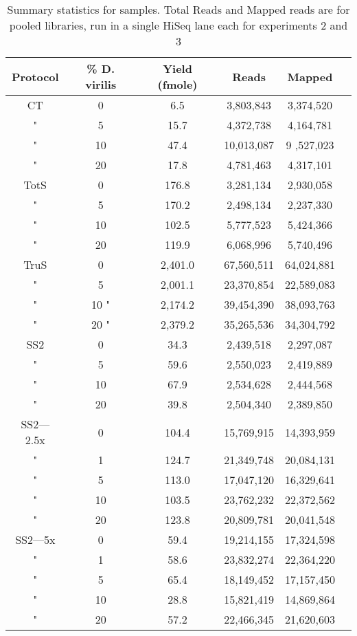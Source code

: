 \begin{table}[htdp]
\begin{center}
\begin{tabular}{|c|c|c|c|c|c|} \hline
Protocol & \%  D. virilis  &  Yield (fmole) & Reads & Mapped \\\hline 
CT & 0  & 6.5  & 3,803,843 & 3,374,520 \\
" &  5 & 15.7  & 4,372,738 & 4,164,781 \\
" & 10 & 47.4  & 10,013,087 &9 ,527,023 \\
" & 20 & 17.8  & 4,781,463 & 4,317,101 \\
TotS & 0  & 176.8  & 3,281,134 & 2,930,058 \\
" &  5  & 170.2  & 2,498,134 & 2,237,330 \\
" & 10  & 102.5  & 5,777,523 & 5,424,366 \\
" & 20  & 119.9  & 6,068,996 &5,740,496 \\
TruS & 0  & 2,401.0  & 67,560,511 & 64,024,881 \\
" &  5  & 2,001.1  & 23,370,854 & 22,589,083 \\
" & 10 " & 2,174.2  & 39,454,390 & 38,093,763 \\
" & 20 " & 2,379.2  & 35,265,536 & 34,304,792 \\
SS2 & 0 & 34.3  & 2,439,518 & 2,297,087 \\
" &  5 & 59.6  & 2,550,023 & 2,419,889 \\
" & 10 & 67.9  & 2,534,628 & 2,444,568 \\
" & 20 & 39.8  & 2,504,340 & 2,389,850 \\
SS2---2.5x & 0 & 104.4  & 15,769,915 & 14,393,959 \\
" &  1 & 124.7  & 21,349,748 & 20,084,131 \\
" &  5 & 113.0  & 17,047,120 & 16,329,641 \\
" & 10 & 103.5  & 23,762,232 & 22,372,562 \\
" & 20 & 123.8  & 20,809,781 & 20,041,548 \\
SS2---5x & 0 & 59.4  & 19,214,155 & 17,324,598 \\
" &  1 & 58.6  & 23,832,274 & 22,364,220 \\
" &  5 & 65.4  & 18,149,452 & 17,157,450 \\
" & 10 & 28.8  & 15,821,419 & 14,869,864 \\
" & 20 & 57.2  & 22,466,345 & 21,620,603 \\
\hline
\end{tabular}
\label{tab:protocols}
\caption{Summary statistics for samples.  Total Reads
     and Mapped reads are for pooled libraries, run in a single HiSeq lane each
     for experiments 2 and 3}
\end{center}
\end{table}
      
